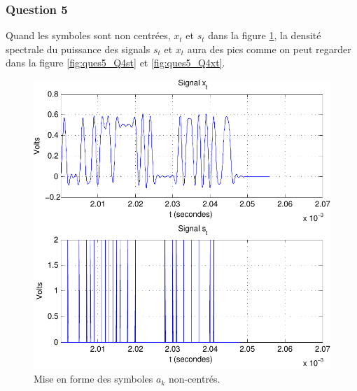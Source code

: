 \documentclass[a4paper,11pt]{article}
\begin{document}
\subsubsection*{Question 5}
Quand les symboles sont non centrées, $x_t$ et $s_t$ dans la figure \ref{fig:ques5_q3}, la densité spectrale du puissance des signals $s_t$ et $x_t$ aura des pics comme on peut regarder dans la figure \ref{fig:ques5_Q4st} et \ref{fig:ques5_Q4xt}.

\begin{figure}[htb]
	\begin{center}
	\includegraphics[scale=1]{question3_noncentree-crop.pdf}
	\caption{Mise en forme des symboles $a_k$ non-centrés.}
	\label{fig:ques5_q3}
	\end{center}
\end{figure}
\end{document}
